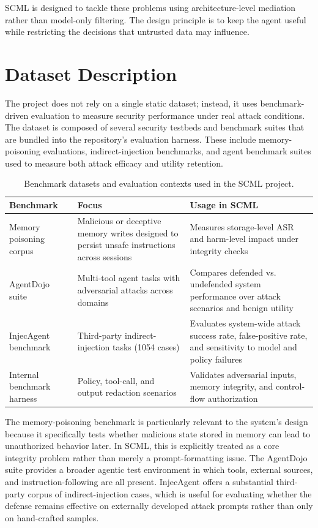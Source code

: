 \documentclass[12pt]{article}
\begin{document}
SCML is designed to tackle these problems using architecture-level mediation rather than model-only filtering. The design principle is to keep the agent useful while restricting the decisions that untrusted data may influence.

\section{Dataset Description}

The project does not rely on a single static dataset; instead, it uses benchmark-driven evaluation to measure security performance under real attack conditions. The dataset is composed of several security testbeds and benchmark suites that are bundled into the repository's evaluation harness. These include memory-poisoning evaluations, indirect-injection benchmarks, and agent benchmark suites used to measure both attack efficacy and utility retention.

\begin{table}[H]
\centering
\caption{Benchmark datasets and evaluation contexts used in the SCML project.}
\renewcommand{\arraystretch}{1.25}
\begin{tabular}{>{\raggedright\arraybackslash}p{3.3cm} >{\raggedright\arraybackslash}p{5.2cm} >{\raggedright\arraybackslash}p{5.4cm}}
\toprule
\textbf{Benchmark} & \textbf{Focus} & \textbf{Usage in SCML} \\
\midrule
Memory poisoning corpus & Malicious or deceptive memory writes designed to persist unsafe instructions across sessions & Measures storage-level ASR and harm-level impact under integrity checks \\
AgentDojo suite & Multi-tool agent tasks with adversarial attacks across domains & Compares defended vs. undefended system performance over attack scenarios and benign utility \\
InjecAgent benchmark & Third-party indirect-injection tasks (1054 cases) & Evaluates system-wide attack success rate, false-positive rate, and sensitivity to model and policy failures \\
Internal benchmark harness & Policy, tool-call, and output redaction scenarios & Validates adversarial inputs, memory integrity, and control-flow authorization \\
\bottomrule
\end{tabular}
\end{table}

The memory-poisoning benchmark is particularly relevant to the system's design because it specifically tests whether malicious state stored in memory can lead to unauthorized behavior later. In SCML, this is explicitly treated as a core integrity problem rather than merely a prompt-formatting issue. The AgentDojo suite provides a broader agentic test environment in which tools, external sources, and instruction-following are all present. InjecAgent offers a substantial third-party corpus of indirect-injection cases, which is useful for evaluating whether the defense remains effective on externally developed attack prompts rather than only on hand-crafted samples.
\end{document}
